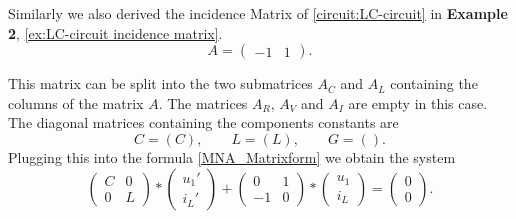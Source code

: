 \begin{example}
	\label{ex:LC-circuit MNA}
	Similarly we also derived the incidence Matrix of \ref{circuit:LC-circuit} in \textbf{Example 2}, \eqref{ex:LC-circuit incidence matrix}.
	\begin{displaymath}
		A = 
		\left(
		\begin{matrix}
			-1 & 1  
		\end{matrix}
		\right).
	\end{displaymath}
	
	This matrix can be split into the two submatrices $A_C$ and $A_L$ containing the columns of the matrix $A$. The matrices $A_R$, $A_V$ and $A_I$ are empty in this case. The diagonal matrices containing the components constants are
	\begin{displaymath}
		C = (C), \qquad L = (L), \qquad G=().
	\end{displaymath}
	Plugging this into the formula \eqref{MNA_Matrixform} we obtain the system
	\begin{displaymath}
		\begin{pmatrix}
			C & 0 \\
			0 & L 
		\end{pmatrix}
		*
		\begin{pmatrix}
			u_1' \\
			i_L'
		\end{pmatrix}
		+
		\begin{pmatrix}
			0 & 1 \\
			-1 & 0
		\end{pmatrix}
		*
		\begin{pmatrix}
			u_1 \\
			i_L
		\end{pmatrix}
		=
		\begin{pmatrix}
			0 \\
			0 
		\end{pmatrix}.
	\end{displaymath}
\end{example}


